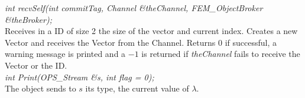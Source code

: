 {\em int recvSelf(int commitTag, Channel \&theChannel, 
FEM\_ObjectBroker \&theBroker); } \\ 
Receives in a ID of size 2 the size of the vector and current index.
Creates a new Vector and receives the Vector from the Channel. 
Returns $0$ if successful, a warning message is printed and a $-1$ is
returned if {\em theChannel} fails to receive the Vector or the ID.\\

{\em int Print(OPS\_Stream \&s, int flag = 0);}\\
The object sends to $s$ its type, the current value of $\lambda$.
